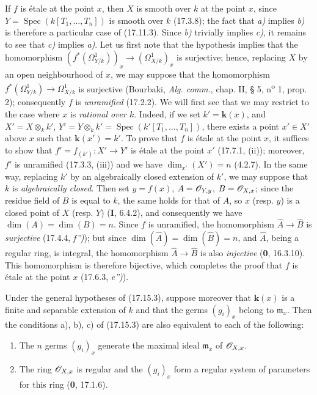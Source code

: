 If $f$ is étale at the point $x$, then $X$ is smooth over $k$ at the point $x$, since $Y=\operatorname{Spec}(k[T_1,\ldots,T_n])$ is smooth over $k$ (17.3.8); the fact that \emph{a)} implies \emph{b)} is therefore a particular case of (17.11.3). Since \emph{b)} trivially implies \emph{c)}, it remains to see that \emph{c)} implies \emph{a)}. Let us first note
that the hypothesis implies that the homomorphism $(f^*(\varOmega^1_{Y/k}))_x\to(\varOmega^1_{X/k})_x$ is surjective; hence, replacing $X$ by an open neighbourhood of $x$, we may suppose that the homomorphism $f^*(\varOmega^1_{Y/k})\to\varOmega^1_{X/k}$ is surjective (Bourbaki, \emph{Alg. comm.}, chap. II, § 5, n\textsuperscript{o} 1, prop. 2); consequently $f$ is \emph{unramified} (17.2.2). We will first see that we may restrict to the case where $x$ is \emph{rational over $k$}. Indeed, if we set $k'=\boldsymbol{k}(x)$, and $X'=X\otimes_k k'$, $Y'=Y\otimes_k k'=\operatorname{Spec}(k'[T_1,\ldots,T_n])$, there exists a point $x'\in X'$ above $x$ such that $\boldsymbol{k}(x')=k'$. To prove that $f$ is étale at the point $x$, it suffices to show that $f'=f_{(k')}:X'\to Y'$ is étale at the point $x'$ (17.7.1, (ii)); moreover, $f'$ is unramified (17.3.3, (iii)) and we have $\dim_{x'}(X')=n$ (4.2.7). In the same way, replacing $k'$ by an algebraically closed extension of $k'$, we may suppose that $k$ is \emph{algebraically closed}. Then set $y=f(x)$, $A=\mathscr{O}_{Y,y}$, $B=\mathscr{O}_{X,x}$; since the residue field of $B$ is equal to $k$, the same holds for that of $A$, so $x$ (resp. $y$) is a closed point of $X$ (resp. $Y$) (\textbf{I}, 6.4.2), and consequently we have $\dim(A)=\dim(B)=n$. Since $f$ is unramified, the homomorphism $\widehat A\to\widehat B$ is \emph{surjective} (17.4.4, \emph{f'')}); but since $\dim(\widehat A)=\dim(\widehat B)=n$, and $\widehat A$, being a regular ring, is integral, the homomorphism $\widehat A\to\widehat B$ is also \emph{injective} (\textbf{0}, 16.3.10). This homomorphism is therefore bijective, which completes the proof that $f$ is étale at the point $x$ (17.6.3, \emph{e'')}).

\begin{corollary}[17.15.4]
\label{IV.17.15.4}
Under the general hypotheses of (17.15.3), suppose moreover that $\boldsymbol{k}(x)$ is a \textup{finite} and \textup{separable} extension of $k$ and that the germs $(g_i)_x$ belong to $\mathfrak m_x$. Then the conditions \textup{a), b), c)} of \textup{(17.15.3)} are also equivalent to each of the following:
\begin{enumerate}
  \item[\textup{d)}] The $n$ germs $(g_i)_x$ generate the maximal ideal $\mathfrak m_x$ of $\mathscr{O}_{X,x}$.
  \item[\textup{d$'$)}] The ring $\mathscr{O}_{X,x}$ is regular and the $(g_i)_x$ form a regular system of parameters for this ring \textup{(\textbf{0}, 17.1.6)}.
\end{enumerate}
\end{corollary}

